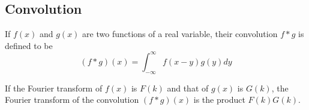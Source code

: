 \subsection{Convolution}

\begin{definition}
    If $f(x)$ and $g(x)$ are two functions of a real variable, their convolution $f*g$ is defined to be \begin{equation*}
        (f*g)(x) = \int_{-\infty}^{\infty}f(x-y)g(y)dy
    \end{equation*}
\end{definition}
If the Fourier transform of $f(x)$ is $F(k)$ and that of $g(x)$ is $G(k)$, the Fourier transform of the convolution $(f*g)(x)$ is the product $F(k)G(k)$.



